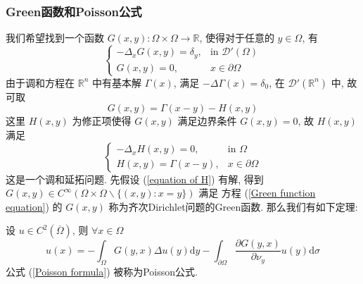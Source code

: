 \documentclass[11pt]{ctexart}[UTF8]
\begin{document}
\subsubsection{Green函数和Poisson公式}
我们希望找到一个函数 $G(x,y): \Omega \times \Omega \to \mathbb{R}$, 使得对于任意的 $y\in \Omega$, 有
\begin{equation}\label{Green function equation}
    \begin{cases}
    -\Delta_{x} G(x,y) = \delta_{y}, & \text{in } \mathscr{D}'(\Omega)\\
    G(x,y) = 0, & x \in \partial\Omega
    \end{cases}
\end{equation}
由于调和方程在 $\mathbb{R}^{n}$ 中有基本解 $\Gamma(x) $, 满足 $-\Delta \Gamma(x) = \delta_0$, 在 $\mathscr{D}'(\mathbb{R}^n)$ 中, 故可取
\begin{equation*}
    G(x,y) = \Gamma(x-y) - H(x,y)
\end{equation*}
这里 $H(x,y)$ 为修正项使得 $G(x,y)$ 满足边界条件 $G(x,y) = 0$, 故 $H(x,y)$ 满足
\begin{equation}\label{equation of H}
    \begin{cases}
    -\Delta_{x} H(x,y) = 0, & \text{in } \Omega\\
    H(x,y) = \Gamma(x-y), & x \in \partial\Omega
    \end{cases}
\end{equation}
这是一个调和延拓问题. 先假设 (\ref{equation of H}) 有解, 得到 $G(x,y) \in C^{\infty}(\Omega \times \Omega\backslash\{(x,y): x=y\})$ 满足
方程 (\ref{Green function equation}) 的 $G(x,y)$ 称为齐次Dirichlet问题的Green函数. 那么我们有如下定理:
\begin{theorem}
    设 $u \in C^2(\overline{\Omega})$, 则 $\forall x \in \Omega$
    \begin{equation}\label{Poisson formula}
        u(x) = -\int_{\Omega} G(y,x) \Delta u(y) \mathrm{d}y - \int_{\partial\Omega} \frac{\partial G(y,x)}{\partial \nu_{y}} u(y) \mathrm{d}\sigma
    \end{equation}
    公式 (\ref{Poisson formula}) 被称为Poisson公式.
\end{theorem}
\end{document}
